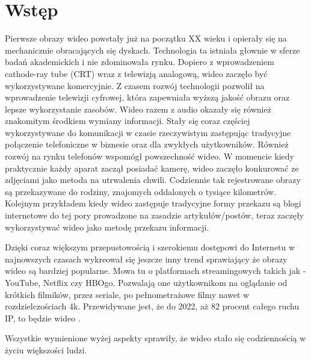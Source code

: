\chapter{Wstęp}
\label{cha:pierwszyDokument}


Pierwsze obrazy wideo powstały już na początku XX wieku i opierały się na mechanicznie obracających się dyskach. Technologia ta istniała głownie w sferze badań akademickich i nie zdominowała rynku. Dopiero z wprowadzeniem cathode-ray tube (CRT) wraz z telewizją analogową, wideo zaczęło być wykorzystywane komercyjnie. Z czasem rozwój technologii pozwolił na wprowadzenie telewizji cyfrowej, która zapewniała wyższą jakość obrazu oraz lepsze wykorzystanie zasobów. Wideo razem z audio okazały się również znakomitym środkiem wymiany informacji. Stały się coraz częściej wykorzystywane do komunikacji w czasie rzeczywistym zastępując tradycyjne połączenie telefoniczne w biznesie oraz dla zwykłych użytkowników. Również rozwój na rynku telefonów wspomógł powszechność wideo. W momencie kiedy praktycznie każdy aparat zaczął posiadać kamerę, wideo zaczęło konkurować ze zdjęciami jako metoda na utrwalenia chwili. Codziennie tak rejestrowane obrazy są przekazywane do rodziny, znajomych oddalonych o tysiące kilometrów. Kolejnym przykładem kiedy wideo zastępuje tradycyjne formy przekazu są blogi internetowe do tej pory prowadzone na zasadzie artykułów/postów, teraz zaczęły wykorzystywać wideo jako metodę przekazu informacji.

Dzięki coraz większym przepustowością i szerokiemu dostępowi do Internetu w najnowszych czasach wykreował się jeszcze inny trend sprawiający że obrazy wideo są bardziej popularne. Mowa tu o platformach streamingowych takich jak - YouTube, Netflix czy HBOgo. Pozwalają one użytkownikom na oglądanie od krótkich filmików, przez seriale, po pełnometrażowe filmy nawet w rozdzielczościach 4k. Przewidywane jest, że do 2022, aż 82 procent całego ruchu IP, to będzie wideo \cite{prediction}. \par


Wszystkie wymienione wyżej aspekty sprawiły, że wideo stało się codziennością w życiu większości ludzi.\par

